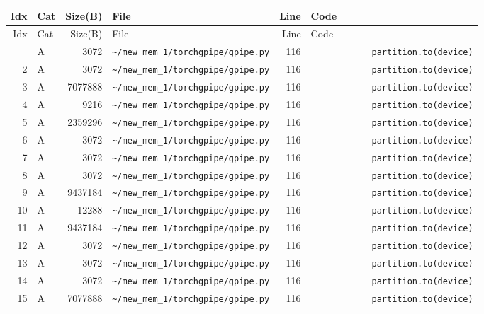 \documentclass{article}
\begin{document}
\begin{longtable}{r l r p{6.5cm} r p{7.0cm}}
\hline
Idx & Cat & Size(B) & File & Line & Code \\
\hline
\endfirsthead
\hline
Idx & Cat & Size(B) & File & Line & Code \\
\hline
\endhead
\hline
\endfoot
1 & A & 3072 & \lstinline|~/mew_mem_1/torchgpipe/gpipe.py| & 116 & \lstinline|            partition.to(device)| \\
2 & A & 3072 & \lstinline|~/mew_mem_1/torchgpipe/gpipe.py| & 116 & \lstinline|            partition.to(device)| \\
3 & A & 7077888 & \lstinline|~/mew_mem_1/torchgpipe/gpipe.py| & 116 & \lstinline|            partition.to(device)| \\
4 & A & 9216 & \lstinline|~/mew_mem_1/torchgpipe/gpipe.py| & 116 & \lstinline|            partition.to(device)| \\
5 & A & 2359296 & \lstinline|~/mew_mem_1/torchgpipe/gpipe.py| & 116 & \lstinline|            partition.to(device)| \\
6 & A & 3072 & \lstinline|~/mew_mem_1/torchgpipe/gpipe.py| & 116 & \lstinline|            partition.to(device)| \\
7 & A & 3072 & \lstinline|~/mew_mem_1/torchgpipe/gpipe.py| & 116 & \lstinline|            partition.to(device)| \\
8 & A & 3072 & \lstinline|~/mew_mem_1/torchgpipe/gpipe.py| & 116 & \lstinline|            partition.to(device)| \\
9 & A & 9437184 & \lstinline|~/mew_mem_1/torchgpipe/gpipe.py| & 116 & \lstinline|            partition.to(device)| \\
10 & A & 12288 & \lstinline|~/mew_mem_1/torchgpipe/gpipe.py| & 116 & \lstinline|            partition.to(device)| \\
11 & A & 9437184 & \lstinline|~/mew_mem_1/torchgpipe/gpipe.py| & 116 & \lstinline|            partition.to(device)| \\
12 & A & 3072 & \lstinline|~/mew_mem_1/torchgpipe/gpipe.py| & 116 & \lstinline|            partition.to(device)| \\
13 & A & 3072 & \lstinline|~/mew_mem_1/torchgpipe/gpipe.py| & 116 & \lstinline|            partition.to(device)| \\
14 & A & 3072 & \lstinline|~/mew_mem_1/torchgpipe/gpipe.py| & 116 & \lstinline|            partition.to(device)| \\
15 & A & 7077888 & \lstinline|~/mew_mem_1/torchgpipe/gpipe.py| & 116 & \lstinline|            partition.to(device)| \\

\end{longtable}
\end{document}
